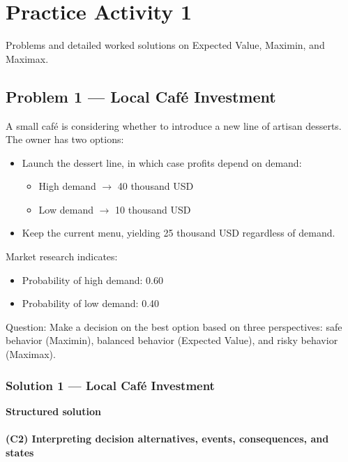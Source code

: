 \section{Practice Activity 1}\label{sec:practice-activity-1}

Problems and detailed worked solutions on Expected Value, Maximin, and Maximax.

\subsection{Problem 1 --- Local Café Investment}\label{subsec:practice-activity-1-problem-1}

A small café is considering whether to introduce a new line of artisan desserts.
The owner has two options:

\begin{itemize}
	\item Launch the dessert line, in which case profits depend on demand:
	\begin{itemize}
		\item High demand \(\rightarrow\) 40 thousand USD
		\item Low demand \(\rightarrow\) 10 thousand USD
	\end{itemize}
	\item Keep the current menu, yielding 25 thousand USD regardless of demand.
\end{itemize}

Market research indicates:

\begin{itemize}
	\item Probability of high demand: 0.60
	\item Probability of low demand: 0.40
\end{itemize}

Question: Make a decision on the best option based on three perspectives: safe behavior (Maximin), balanced behavior (Expected Value), and risky behavior (Maximax).

\subsubsection{Solution 1 --- Local Café Investment}\label{subsec:practice-activity-1-solution-1}

\textbf{Structured solution}

\paragraph{(C2) Interpreting decision alternatives, events, consequences, and states}\label{subsubsec:practice-activity-1-solution-1-c2}

